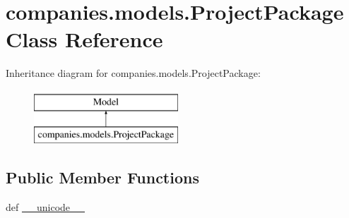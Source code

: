 \hypertarget{classcompanies_1_1models_1_1_project_package}{\section{companies.\-models.\-Project\-Package Class Reference}
\label{classcompanies_1_1models_1_1_project_package}
}
Inheritance diagram for companies.\-models.\-Project\-Package\-:\begin{figure}[H]
\begin{center}
\leavevmode
\includegraphics[height=2.000000cm]{classcompanies_1_1models_1_1_project_package}
\end{center}
\end{figure}
\subsection*{Public Member Functions}
\begin{DoxyCompactItemize}
\item 
def \hyperlink{classcompanies_1_1models_1_1_project_package_ad557f5b24f35b8910180726b2be09ec9}{\-\_\-\-\_\-unicode\-\_\-\-\_\-}
\end{DoxyCompactItemize}
